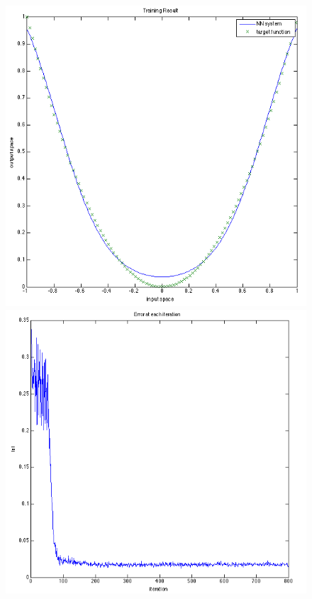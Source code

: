 \documentclass[12pt]{article}
\begin{document}
\vspace{2em}
\begin{figure}[ht]
	\includegraphics[scale=.45]{../res/result_quadratic_nN2.png}
	\includegraphics[scale=.45]{../res/absErr_quadratic_nN2.png}
\end{figure}
\end{document}
